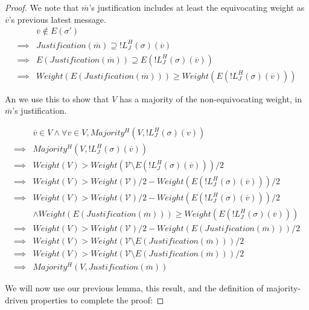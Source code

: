 \begin{proof}

We note that $\overline{m}$'s justification includes at least the equivocating weight as $\overline{v}$'s previous latest message.
\begin{align}
        &\overline{v} \notin E(\sigma') \\
\implies&Justification(\overline{m}) \supseteq !L^H_J(\sigma)(\overline{v}) \\
\implies&E(Justification(\overline{m})) \supseteq E(!L^H_J(\sigma)(\overline{v})) \\
\implies&Weight(E(Justification(\overline{m}))) \geq Weight(E(!L^H_J(\sigma)(\overline{v})))
\end{align}

An we use this to show that $V$ has a majority of the non-equivocating weight, in $\overline{m}$'s justification.

\begin{align}
          &\overline{v} \in V \land \forall v \in V, Majority^H(V, !L^H_J(\sigma)(v)) \\
\implies&Majority^H(V, !L^H_J(\sigma)(\overline{v})) \\
\implies&Weight(V) > Weight(\mathcal{V} \setminus E(!L^H_J(\sigma)(\overline{v})))/2 \\
\implies&Weight(V) > Weight(\mathcal{V})/2 - Weight(E(!L^H_J(\sigma)(\overline{v})))/2 \\
\implies&Weight(V) > Weight(\mathcal{V})/2 - Weight(E(!L^H_J(\sigma)(\overline{v})))/2 \\
        &\land Weight(E(Justification(\overline{m}))) \geq Weight(E(!L^H_J(\sigma)(\overline{v}))) \\
\implies&Weight(V) > Weight(\mathcal{V})/2 - Weight(E(Justification(\overline{m})))/2 \\
\implies&Weight(V) > Weight(\mathcal{V} \setminus E(Justification(\overline{m})))/2 \\
\implies&Weight(V) > Weight(\mathcal{V} \setminus E(Justification(\overline{m})))/2 \\
\implies&Majority^H(V, Justification(\overline{m}))
\end{align}

We will now use our previous lemma, this result, and the definition of majority-driven properties to complete the proof:


\end{proof}
